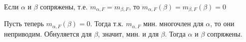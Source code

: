 Если $\alpha$ и $\beta$ сопряжены, т.е. $m_{\alpha,F} = m_{\beta,F}$, то $m_{\alpha,F}(\beta) = m_{\beta,F}(\beta) = 0$

Пусть теперь $m_{\alpha,F}(\beta) = 0$. Тогда т.к. $m_{\alpha,F}$ мин. многочлен для  $\alpha$, то они неприводим. Обнуляется для $\beta$, значит, мин. и для $\beta$. Тогда $\alpha$ и $\beta$ сопряжены.
